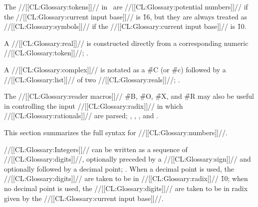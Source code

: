                                   
The //[[CL:Glossary:tokens]]// in \thenextfigure\ are //[[CL:Glossary:potential numbers]]//
if the //[[CL:Glossary:current input base]]// is \f{16}, 
but they are always treated as //[[CL:Glossary:symbols]]// if the //[[CL:Glossary:current input base]]// is \f{10}. 


\endsubsubsubsection%

\endsubsubsection%

\endsubsection%


A //[[CL:Glossary:real]]// is constructed directly from a corresponding numeric //[[CL:Glossary:token]]//;
\seefigure\SyntaxForNumericTokens.

A //[[CL:Glossary:complex]]// is notated as a \f{\#C} (or \f{\#c}) followed by a //[[CL:Glossary:list]]//
of two //[[CL:Glossary:reals]]//; \seesection\SharpsignC.

The //[[CL:Glossary:reader macros]]// \f{\#B}, \f{\#O}, \f{\#X}, and \f{\#R} may also be useful
in controlling the input //[[CL:Glossary:radix]]// in which //[[CL:Glossary:rationals]]// are parsed;
 \seesection\SharpsignB,
     \secref\SharpsignO,
     \secref\SharpsignX,
 and \secref\SharpsignR.

This section summarizes the full syntax for //[[CL:Glossary:numbers]]//.









//[[CL:Glossary:Integers]]// can be written as a sequence of //[[CL:Glossary:digits]]//, 
optionally preceded by a //[[CL:Glossary:sign]]// and optionally followed by a decimal point;
\seefigure\SyntaxForNumericTokens.
When a decimal point is used,
the //[[CL:Glossary:digits]]// are taken to be in //[[CL:Glossary:radix]]// \f{10};
when no decimal point is used,
the //[[CL:Glossary:digits]]// are taken to be in radix given by the //[[CL:Glossary:current input base]]//.

